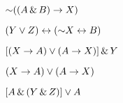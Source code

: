 \begin{earg}
\item $\mathord{\sim} ((A \,\&\, B) \rightarrow X) $

%
%


\item $(Y \vee Z) \leftrightarrow	 (\mathord{\sim} X \leftrightarrow B)$

%

\item $[(X \rightarrow A) \vee (A \rightarrow X)] \,\&\, Y$


\item $(X  \rightarrow  A) \vee  (A \rightarrow X)$


\item $[A \,\&\, (Y \,\&\, Z)] \vee A $


\end{earg}


